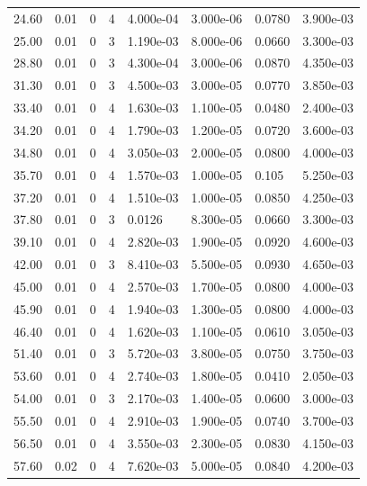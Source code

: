\documentclass[preview]{standalone}
\begin{document}
{{\begin{tabular}{L{1.2cm}C{1.2cm} C{0.3cm}C{0.5cm} C{1.4cm}C{1.4cm} C{1.4cm}C{1.4cm}}
  24.60  &  0.01  & 0     &  4 &  4.000e-04  & 3.000e-06  & 0.0780 &  3.900e-03   \\ 
  25.00  &  0.01  & 0     &  3 &  1.190e-03  & 8.000e-06  & 0.0660 &  3.300e-03   \\ 
  28.80  &  0.01  & 0     &  3 &  4.300e-04  & 3.000e-06  & 0.0870 &  4.350e-03   \\ 
  31.30  &  0.01  & 0     &  3 &  4.500e-03  & 3.000e-05  & 0.0770 &  3.850e-03   \\ 
  33.40  &  0.01  & 0     &  4 &  1.630e-03  & 1.100e-05  & 0.0480 &  2.400e-03   \\ 
  34.20  &  0.01  & 0     &  4 &  1.790e-03  & 1.200e-05  & 0.0720 &  3.600e-03   \\ 
  34.80  &  0.01  & 0     &  4 &  3.050e-03  & 2.000e-05  & 0.0800 &  4.000e-03   \\ 
  35.70  &  0.01  & 0     &  4 &  1.570e-03  & 1.000e-05  & 0.105 &  5.250e-03   \\ 
  37.20  &  0.01  & 0     &  4 &  1.510e-03  & 1.000e-05  & 0.0850 &  4.250e-03   \\ 
  37.80  &  0.01  & 0     &  3 &  0.0126  & 8.300e-05  & 0.0660 &  3.300e-03   \\ 
  39.10  &  0.01  & 0     &  4 &  2.820e-03  & 1.900e-05  & 0.0920 &  4.600e-03   \\ 
  42.00  &  0.01  & 0     &  3 &  8.410e-03  & 5.500e-05  & 0.0930 &  4.650e-03   \\ 
  45.00  &  0.01  & 0     &  4 &  2.570e-03  & 1.700e-05  & 0.0800 &  4.000e-03   \\ 
  45.90  &  0.01  & 0     &  4 &  1.940e-03  & 1.300e-05  & 0.0800 &  4.000e-03   \\ 
  46.40  &  0.01  & 0     &  4 &  1.620e-03  & 1.100e-05  & 0.0610 &  3.050e-03   \\ 
  51.40  &  0.01  & 0     &  3 &  5.720e-03  & 3.800e-05  & 0.0750 &  3.750e-03   \\ 
  53.60  &  0.01  & 0     &  4 &  2.740e-03  & 1.800e-05  & 0.0410 &  2.050e-03   \\ 
  54.00  &  0.01  & 0     &  3 &  2.170e-03  & 1.400e-05  & 0.0600 &  3.000e-03   \\ 
  55.50  &  0.01  & 0     &  4 &  2.910e-03  & 1.900e-05  & 0.0740 &  3.700e-03   \\ 
  56.50  &  0.01  & 0     &  4 &  3.550e-03  & 2.300e-05  & 0.0830 &  4.150e-03   \\ 
  57.60  &  0.02  & 0     &  4 &  7.620e-03  & 5.000e-05  & 0.0840 &  4.200e-03   \\ 

\end{tabular}}}
\end{document}
